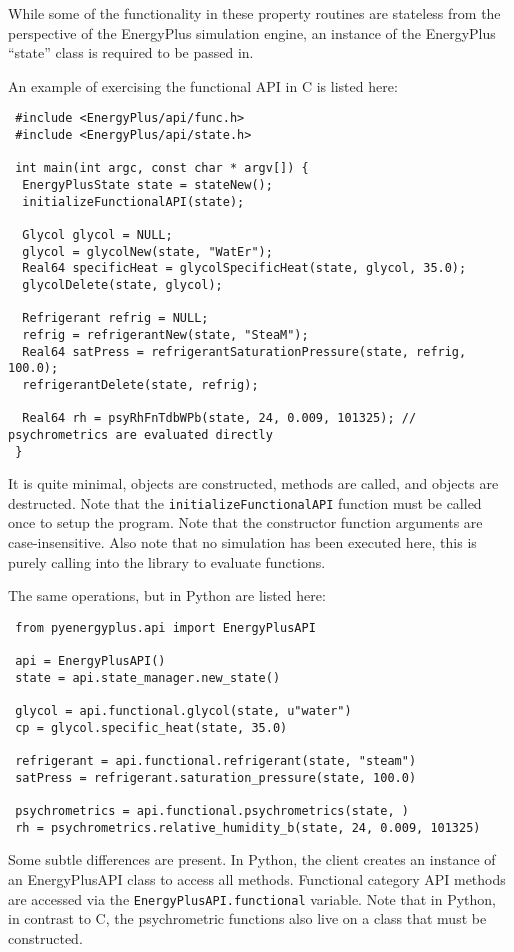 While some of the functionality in these property routines are stateless from the perspective of the EnergyPlus simulation engine, an instance of the EnergyPlus ``state'' class is required to be passed in.

An example of exercising the functional API in C is listed here:

\begin{lstlisting}
 #include <EnergyPlus/api/func.h>
 #include <EnergyPlus/api/state.h>

 int main(int argc, const char * argv[]) {
  EnergyPlusState state = stateNew();
  initializeFunctionalAPI(state);

  Glycol glycol = NULL;
  glycol = glycolNew(state, "WatEr");
  Real64 specificHeat = glycolSpecificHeat(state, glycol, 35.0);
  glycolDelete(state, glycol);

  Refrigerant refrig = NULL;
  refrig = refrigerantNew(state, "SteaM");
  Real64 satPress = refrigerantSaturationPressure(state, refrig, 100.0);
  refrigerantDelete(state, refrig);

  Real64 rh = psyRhFnTdbWPb(state, 24, 0.009, 101325); // psychrometrics are evaluated directly
 }
\end{lstlisting}

It is quite minimal, objects are constructed, methods are called, and objects are destructed.
Note that the \verb=initializeFunctionalAPI= function must be called once to setup the program.
Note that the constructor function arguments are case-insensitive.
Also note that no simulation has been executed here, this is purely calling into the library to evaluate functions.

The same operations, but in Python are listed here:

\begin{lstlisting}
 from pyenergyplus.api import EnergyPlusAPI

 api = EnergyPlusAPI()
 state = api.state_manager.new_state()

 glycol = api.functional.glycol(state, u"water")
 cp = glycol.specific_heat(state, 35.0)

 refrigerant = api.functional.refrigerant(state, "steam")
 satPress = refrigerant.saturation_pressure(state, 100.0)

 psychrometrics = api.functional.psychrometrics(state, )
 rh = psychrometrics.relative_humidity_b(state, 24, 0.009, 101325)
\end{lstlisting}

Some subtle differences are present.
In Python, the client creates an instance of an EnergyPlusAPI class to access all methods.
Functional category API methods are accessed via the \verb=EnergyPlusAPI.functional= variable.
Note that in Python, in contrast to C, the psychrometric functions also live on a class that must be constructed.

